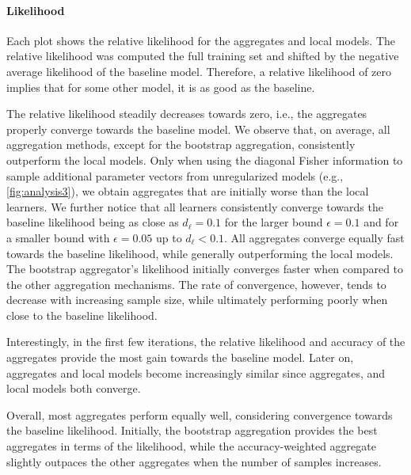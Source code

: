 \paragraph*{Likelihood}
Each plot shows the relative likelihood for the aggregates and local models.
The relative likelihood was computed \wrt the full training set and shifted by the negative average likelihood of the baseline model.
Therefore, a relative likelihood of zero implies that for some other model, it is as good as the baseline.

The relative likelihood steadily decreases towards zero, i.e., the aggregates properly converge towards the baseline model.
We observe that, on average, all aggregation methods, except for the bootstrap aggregation, consistently outperform the local models. 
Only when using the diagonal Fisher information to sample additional parameter vectors from unregularized models (e.g., \autoref{fig:analysis3}), we obtain aggregates that are initially worse than the local learners.
We further notice that all learners consistently converge towards the baseline likelihood being as close as $d_{\ell} = 0.1$ for the larger bound $\epsilon = 0.1$ and for a smaller bound with $\epsilon = 0.05$ up to $d_{\ell} < 0.1$.
All aggregates converge equally fast towards the baseline likelihood, while generally outperforming the local models.
The bootstrap aggregator's likelihood initially converges faster when compared to the other aggregation mechanisms. 
The rate of convergence, however, tends to decrease with increasing sample size, while ultimately performing poorly when close to the baseline likelihood.

Interestingly, in the first few iterations, the relative likelihood and accuracy of the aggregates provide the most gain towards the baseline model. 
Later on, aggregates and local models become increasingly similar since aggregates, and local models both converge. 

Overall, most aggregates perform equally well, considering convergence towards the baseline likelihood.
Initially, the bootstrap aggregation provides the best aggregates in terms of the likelihood, while the accuracy-weighted aggregate slightly outpaces the other aggregates when the number of samples increases.

